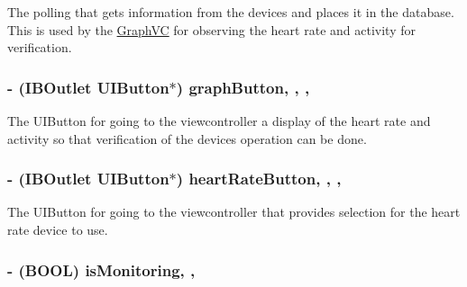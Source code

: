 The polling that gets information from the devices and places it in the database. This is used by the \hyperlink{interface_graph_v_c}{Graph\-V\-C} for observing the heart rate and activity for verification. \hypertarget{interface_home_screen_v_c_a1e29323a37c594f0e641d1f660605721}{
\subsubsection[{graph\-Button}]{\setlength{\rightskip}{0pt plus 5cm}-\/ (I\-B\-Outlet U\-I\-Button$\ast$) graph\-Button\hspace{0.3cm}{\ttfamily [read]}, {\ttfamily [write]}, {\ttfamily [nonatomic]}, {\ttfamily [retain]}}}\label{interface_home_screen_v_c_a1e29323a37c594f0e641d1f660605721}
The U\-I\-Button for going to the viewcontroller a display of the heart rate and activity so that verification of the devices operation can be done. \hypertarget{interface_home_screen_v_c_af710ad88b755f5ac91d32478a385af6f}{
\subsubsection[{heart\-Rate\-Button}]{\setlength{\rightskip}{0pt plus 5cm}-\/ (I\-B\-Outlet U\-I\-Button$\ast$) heart\-Rate\-Button\hspace{0.3cm}{\ttfamily [read]}, {\ttfamily [write]}, {\ttfamily [nonatomic]}, {\ttfamily [retain]}}}\label{interface_home_screen_v_c_af710ad88b755f5ac91d32478a385af6f}
The U\-I\-Button for going to the viewcontroller that provides selection for the heart rate device to use. \hypertarget{interface_home_screen_v_c_afa80d36d3ba21b19c0aea885cc76f811}{
\subsubsection[{is\-Monitoring}]{\setlength{\rightskip}{0pt plus 5cm}-\/ (B\-O\-O\-L) is\-Monitoring\hspace{0.3cm}{\ttfamily [read]}, {\ttfamily [write]}, {\ttfamily [atomic]}}}\label{interface_home_screen_v_c_afa80d36d3ba21b19c0aea885cc76f811}
